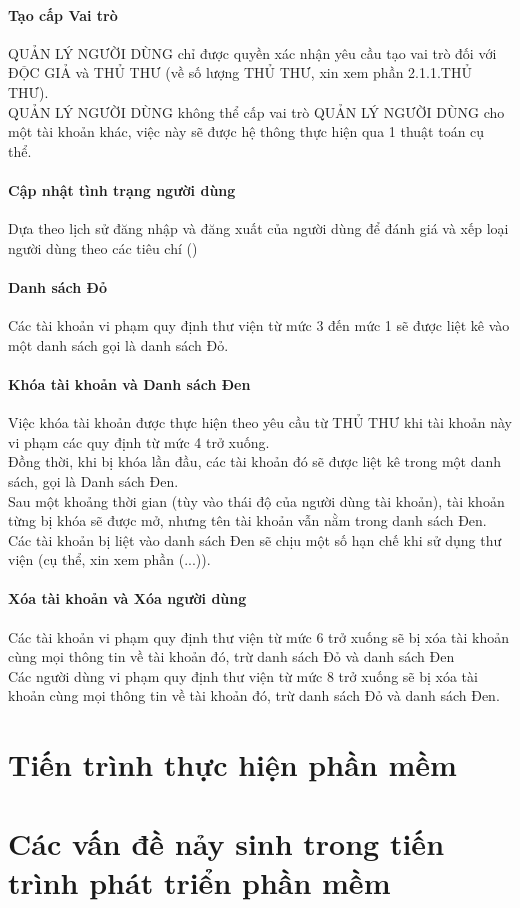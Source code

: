 \documentclass[12pt,a4paper]{report}
\begin{document}
			\subsubsection{Tạo cấp Vai trò}
			QUẢN LÝ NGƯỜI DÙNG chỉ được quyền xác nhận yêu cầu tạo vai trò đối với ĐỘC GIẢ và THỦ THƯ (về số lượng THỦ THƯ, xin xem phần 2.1.1.THỦ THƯ).\\
			QUẢN LÝ NGƯỜI DÙNG không thể cấp vai trò QUẢN LÝ NGƯỜI DÙNG cho một tài khoản khác, việc này sẽ được hệ thông thực hiện qua 1 thuật toán cụ thể.\\

			\subsubsection{Cập nhật tình trạng người dùng}
			Dựa theo lịch sử đăng nhập và đăng xuất của người dùng để đánh giá và xếp loại người dùng theo các tiêu chí ()\\ %

			\subsubsection{Danh sách Đỏ}
			Các tài khoản vi phạm quy định thư viện từ mức 3 đến mức 1 sẽ được liệt kê vào một danh sách gọi là danh sách Đỏ.\\

			\subsubsection{Khóa tài khoản và Danh sách Đen}
			Việc khóa tài khoản được thực hiện theo yêu cầu từ THỦ THƯ khi tài khoản này vi phạm các quy định từ mức 4 trở xuống.\\
			Đồng thời, khi bị khóa lần đầu, các tài khoản đó sẽ được liệt kê trong một danh sách, gọi là Danh sách Đen.\\
			Sau một khoảng thời gian (tùy vào thái độ của người dùng tài khoản), tài khoản từng bị khóa sẽ được mở, nhưng tên tài khoản vẫn nằm trong danh sách Đen.\\
			Các tài khoản bị liệt vào danh sách Đen sẽ chịu một số hạn chế khi sử dụng thư viện (cụ thể, xin xem phần (...)).\\

			\subsubsection{Xóa tài khoản và Xóa người dùng}
			Các tài khoản vi phạm quy định thư viện từ mức 6 trở xuống sẽ bị xóa tài khoản cùng mọi thông tin về tài khoản đó, trừ danh sách Đỏ và danh sách Đen\\
			Các người dùng vi phạm quy định thư viện từ mức 8 trở xuống sẽ bị xóa tài khoản cùng mọi thông tin về tài khoản đó, trừ danh sách Đỏ và danh sách Đen.\\
\chapter{Tiến trình thực hiện phần mềm}
\chapter{Các vấn đề nảy sinh trong tiến trình phát triển phần mềm}
\end{document}
